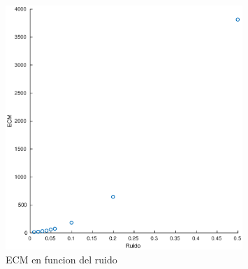 \begin{figure}[H]
	\centering	\includegraphics[width=0.8\textwidth]{img/ruido_ecm}
	\caption{ECM en funcion del ruido}
	\label{fig:ruido_ecm}
\end{figure}